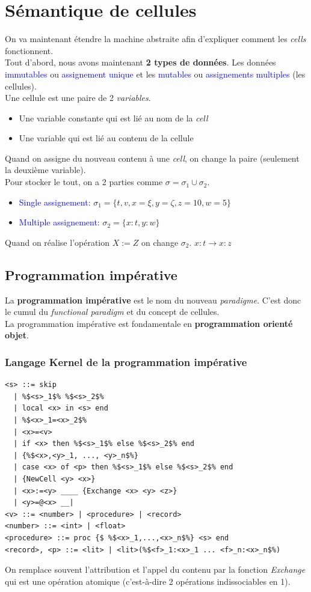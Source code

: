 \documentclass{report}
\begin{document}
\section{Sémantique de cellules}
On va maintenant étendre la machine abstraite afin d'expliquer comment les \textit{cells} fonctionnent.\\
Tout d'abord, nous avons maintenant \textbf{2 types de données}. Les données \textcolor{blue}{immutables} ou \textcolor{blue}{assignement unique} et les \textcolor{blue}{mutables} ou \textcolor{blue}{assignements multiples} (les cellules).\\
Une cellule est une paire de 2 \textit{variables}.
\begin{itemize}
\item Une variable constante qui est lié au nom de la \textit{cell}
\item Une variable qui est lié au contenu de la cellule
\end{itemize}
Quand on assigne du nouveau contenu à une \textit{cell}, on change la paire (seulement la deuxième variable).\\

Pour stocker le tout, on a 2 parties comme $\sigma = \sigma_1 \cup \sigma_2$.
\begin{itemize}
\item \textcolor{blue}{Single assignement}: $\sigma_1 = \{t,v,x=\xi,y = \zeta , z = 10, w = 5 \}$
\item \textcolor{blue}{Multiple assignement}: $\sigma_2 = \{x:t, y:w\}$
\end{itemize}
Quand on réalise l'opération $X:=Z$ on change $\sigma_2$. $x:t \rightarrow x:z$

\subsection{Programmation impérative}
La \textbf{programmation impérative} est le nom du nouveau \textit{paradigme}. C'est donc le cumul du \textit{functional paradigm} et du concept de cellules.\\
La programmation impérative est fondamentale en \textbf{programmation orienté objet}.

\subsubsection{Langage Kernel de la programmation impérative}
\begin{lstlisting}[escapechar=\%]
<s> ::= skip 
  | %$<s>_1$% %$<s>_2$% 
  | local <x> in <s> end 
  | %$<x>_1=<x>_2$%
  | <x>=<v> 
  | if <x> then %$<s>_1$% else %$<s>_2$% end 
  | {%$<x>,<y>_1, ..., <y>_n$%} 
  | case <x> of <p> then %$<s>_1$% else %$<s>_2$% end 
  | {NewCell <y> <x>} 
  | <x>:=<y> ____ {Exchange <x> <y> <z>}
  | <y>=@<x> __|
<v> ::= <number> | <procedure> | <record> 
<number> ::= <int> | <float> 
<procedure> ::= proc {$ %$<x>_1,...,<x>_n$%} <s> end
<record>, <p> ::= <lit> | <lit>(%$<f>_1:<x>_1 ... <f>_n:<x>_n$%)
\end{lstlisting}
On remplace souvent l'attribution et l'appel du contenu par la fonction \textit{Exchange} qui est une opération atomique (c'est-à-dire 2 opérations indissociables en 1).
\end{document}
